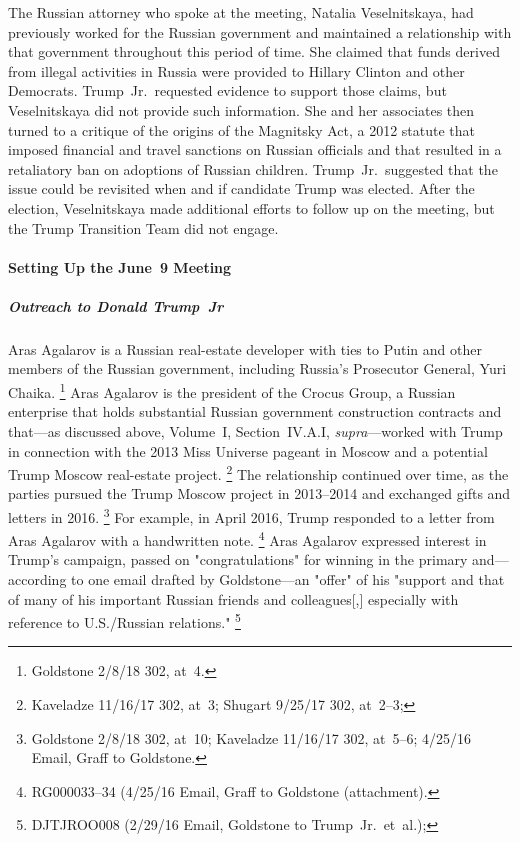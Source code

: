 The Russian attorney who spoke at the meeting, Natalia Veselnitskaya, had previously worked for the Russian government and maintained a relationship with that government throughout this period of time.
She claimed that funds derived from illegal activities in Russia were provided to Hillary Clinton and other Democrats.
Trump~Jr.\ requested evidence to support those claims, but Veselnitskaya did not provide such information.
She and her associates then turned to a critique of the origins of the Magnitsky Act, a 2012 statute that imposed financial and travel sanctions on Russian officials and that resulted in a retaliatory ban on adoptions of Russian children.
Trump~Jr.\ suggested that the issue could be revisited when and if candidate Trump was elected.
After the election, Veselnitskaya made additional efforts to follow up on the meeting, but the Trump Transition Team did not engage.

\paragraph{Setting Up the June~9 Meeting}

\subparagraph{Outreach to Donald Trump~Jr}

Aras Agalarov is a Russian real-estate developer with ties to Putin and other members of the Russian government, including Russia's Prosecutor General, Yuri Chaika.%
\footnote{ Goldstone 2/8/18 302, at~4.}
Aras Agalarov is the president of the Crocus Group, a Russian enterprise that holds substantial Russian government construction contracts and that---as discussed above, Volume~I, Section~IV.A.I, \textit{supra}---worked with Trump in connection with the 2013 Miss Universe pageant in Moscow and a potential Trump Moscow real-estate project.%
\footnote{ Kaveladze 11/16/17 302, at~3;
Shugart 9/25/17 302, at~2--3;
}
The relationship continued over time, as the parties pursued the Trump Moscow project in 2013--2014 and exchanged gifts and letters in 2016.%
\footnote{ Goldstone 2/8/18 302, at~10;
 Kaveladze 11/16/17 302, at~5--6;
4/25/16 Email, Graff to Goldstone.}
For example, in April 2016, Trump responded to a letter from Aras Agalarov with a handwritten note.%
\footnote{RG000033--34 (4/25/16 Email, Graff to Goldstone (attachment).}
Aras Agalarov expressed interest in Trump's campaign, passed on "congratulations" for winning in the primary and---according to one email drafted by Goldstone---an "offer" of his "support and that of many of his important Russian friends and colleagues[,] especially with reference to U.S./Russian relations."%
\footnote{DJTJROO008 (2/29/16 Email, Goldstone to Trump~Jr.\ et~al.);
}

